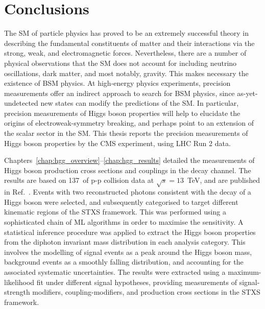 \chapter{Conclusions}
\label{chap:conclusions}

The SM of particle physics has proved to be an extremely successful theory in describing the fundamental constituents of matter and their interactions via the strong, weak, and electromagnetic forces. Nevertheless, there are a number of physical observations that the SM does not account for including neutrino oscillations, dark matter, and most notably, gravity. This makes necessary the existence of BSM physics. At high-energy physics experiments, precision measurements offer an indirect approach to search for BSM physics, since as-yet-undetected new states can modify the predictions of the SM. In particular, precision measurements of Higgs boson properties will help to elucidate the origins of electroweak-symmetry breaking, and perhaps point to an extension of the scalar sector in the SM.  This thesis reports the precision measurements of Higgs boson properties by the CMS experiment, using LHC Run 2 data.

Chapters~\ref{chap:hgg_overview}--\ref{chap:hgg_results} detailed the measurements of Higgs boson production cross sections and couplings in the \Hgg decay channel. The results are based on 137~\fbinv of p-p collision data at $\sqrt{s}=13$~TeV, and are published in Ref.~\cite{Sirunyan:2021ybb}. Events with two reconstructed photons consistent with the decay of a Higgs boson were selected, and subsequently categorised to target different kinematic regions of the STXS framework. This was performed using a sophisticated chain of ML algorithms in order to maximise the sensitivity. A statistical inference procedure was applied to extract the Higgs boson properties from the diphoton invariant mass distribution in each analysis category. This involves the modelling of signal events as a peak around the Higgs boson mass, background events as a smoothly falling distribution, and accounting for the associated systematic uncertainties. The results were extracted using a maximum-likelihood fit under different signal hypotheses, providing measurements of signal-strength modifiers, coupling-modifiers, and production cross sections in the STXS framework.

